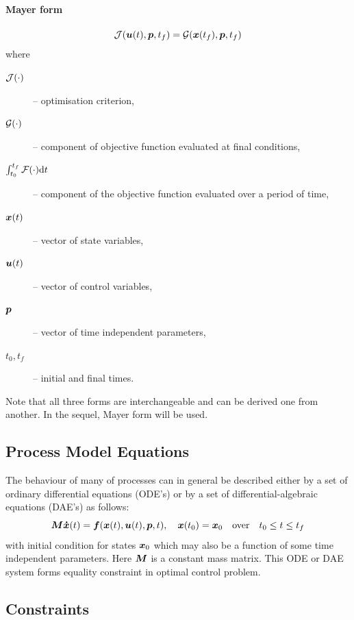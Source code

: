 \paragraph{Mayer form}
\begin{equation}
\mf{J}(\ve{u}(t),\ve{p},t_{f}) = \mf{G}(\ve{x}(t_{f}),\ve{p},t_{f})
\label{eq:mayer} 
\end{equation}where
\begin{description}
\item[$\mathcal{J}(\cdot)$] -- optimisation criterion,
\item[$\mathcal{G}(\cdot)$] -- component of objective function evaluated at
  final conditions, 
\item[$\int_{t_{0}}^{t_{f}}\mathcal{F}(\cdot)\textnormal{\text{d}}{}t$] -- component of the
  objective 
  function evaluated over a period of time, 
\item[$\ve{x}(t)$] --  vector of state variables,
\item[$\ve{u}(t)$] -- vector of control variables,
\item[$\ve{p}$] -- vector of time independent parameters,
\item[$t_0,t_{f}$] -- initial and final times.
\end{description}
Note that all three forms are interchangeable and can be derived one
from another. In the sequel, Mayer form will be used.
 
\subsection{Process Model Equations}
\label{sec:pme}

The behaviour of many of processes can in general be described either
by a set of ordinary differential equations (ODE's) or by a set of
differential-algebraic equations (DAE's) as follows:
\begin{equation}
\ve{M\dot{x}}(t) = \ve{f}(\ve{x}(t),\ve{u}(t),\ve{p},t), \quad
\ve{x}(t_{0}) = \ve{x}_{0} \quad \textnormal{over} \quad t_{0} \leq t
\leq t_{f} \label{eq:process} 
\end{equation} with initial condition for states $\ve{x}_{0}$ which may
also be a function of some time independent parameters. Here $\ve{M}$
is a constant mass matrix. This ODE or DAE system forms equality constraint
in optimal control problem. 

\subsection{Constraints}
\label{sec:cons}

